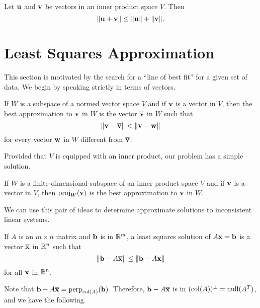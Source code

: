 \documentclass[../m073main.tex]{subfiles}
\begin{document}
\begin{theorem}
	Let $\mathbf{u}$ and $\mathbf{v}$ be vectors in an inner product space $V$.
	Then
	\[ \|\mathbf{u} + \mathbf{v}\| \leq \|\mathbf{u}\| + \|\mathbf{v}\|. \]
\end{theorem}

\section{Least Squares Approximation}
This section is motivated by the search for a ``line of best fit'' for a given set of data.
We begin by speaking strictly in terms of vectors.

\begin{definition}
	If $W$ is a subspace of a normed vector space $V$ and if $\mathbf{v}$ is a vector in $V$, then the best approximation to $\mathbf{v}$ in $W$ is the vector $\overline{\mathbf{v}}$ in $W$ such that
	\[ \|\mathbf{v} - \overline{\mathbf{v}}\| < \|\mathbf{v} - \mathbf{w}\| \]
	for every vector $\mathbf{w}$ in $W$ different from $\overline{\mathbf{v}}$.
\end{definition}

Provided that $V$ is equipped with an inner product, our problem has a simple solution.

\begin{theorem}
	If $W$ is a finite-dimensional subspace of an inner product space $V$ and if $\mathbf{v}$ is a vector in $V$, then $\textrm{proj}_W(\mathbf{v})$ is the best approximation to $\mathbf{v}$ in $W$.
\end{theorem}

We can use this pair of ideas to determine approximate solutions to inconsistent linear systems.

\begin{definition}
	If $A$ is an $m \times n$ matrix and $\mathbf{b}$ is in $\mathbb{R}^m$, a least squares solution of $A \mathbf{x} = \mathbf{b}$ is a vector $\overline{\mathbf{x}}$ in $\mathbb{R}^n$ such that
	\[ \|\mathbf{b} - A \overline{\mathbf{x}}\| \leq \|\mathbf{b} - A \mathbf{x}\| \]
	for all $\mathbf{x}$ in $\mathbb{R}^n$.
\end{definition}

Note that $\mathbf{b} - A \overline{\mathbf{x}} = \textrm{perp}_{\textrm{col}(A)}(\mathbf{b})$.
Therefore, $\mathbf{b} - A \overline{\mathbf{x}}$ is in $(\textrm{col}(A))^\perp = \textrm{null}(A^T)$, and we have the following.
\end{document}
